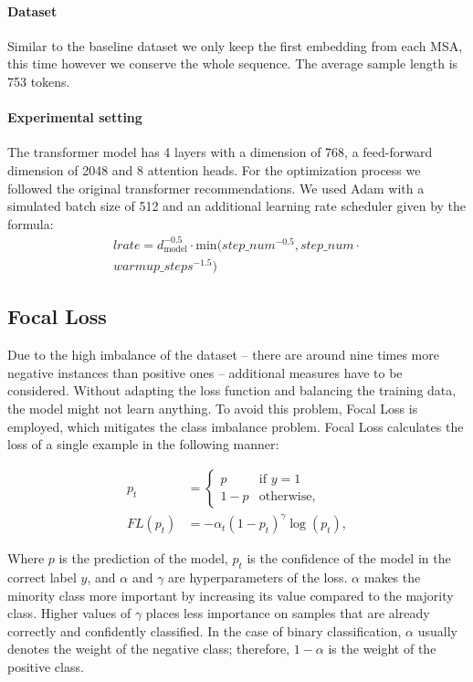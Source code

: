 \documentclass[11pt,a4paper]{article}
\begin{document}
\paragraph{Dataset}
Similar to the baseline dataset we only keep the first embedding from each MSA, this time however we conserve the whole sequence. The average sample length is 753 tokens.


\paragraph{Experimental setting} 

The transformer model has 4 layers with a dimension of 768, a feed-forward dimension of 2048 and 8 attention heads. For the optimization process we followed the original transformer recommendations. We used Adam with a simulated batch size of 512 and an additional learning rate scheduler given by the formula:
\begin{align*}
    lrate = d_\text{model}^{-0.5} \cdot \text{min}(step\_num^{-0.5}, step\_num \cdot \\ warmup\_steps^{-1.5})
\end{align*}




\subsection{Focal Loss}

Due to the high imbalance of the dataset -- there are around nine times more negative instances than positive ones -- additional measures have to be considered. Without adapting the loss function and balancing the training data, the model might not learn anything. To avoid this problem, Focal Loss \cite{lin2017focal} is employed, which mitigates the class imbalance problem. Focal Loss calculates the loss of a single example in the following manner:

\begin{align}
    p_t &= 
    \begin{cases}
     p & \text{if } y = 1  \\
     1 - p & \text{otherwise},
    \end{cases} \\
    FL(p_t) &= -\alpha_t (1 - p_t)^{\gamma}\log(p_t),
\end{align}

\noindent
Where $p$ is the prediction of the model, $p_t$ is the confidence of the model in the correct label $y$, and $\alpha$ and $\gamma$  are hyperparameters of the loss. $\alpha$ makes the minority class more important by increasing its value compared to the majority class. Higher values of $\gamma$ places less importance on samples that are already correctly and confidently classified. In the case of binary classification, $\alpha$ usually denotes the weight of the negative class; therefore, $1 - \alpha$ is the weight of the positive class.
\end{document}
